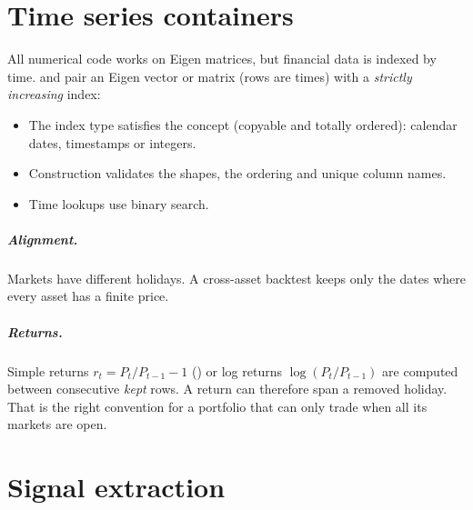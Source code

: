 
\chapter{Time series containers}\label{c:sec:dataframe}

All numerical code works on Eigen matrices, but financial data is indexed by time.
 and  pair an Eigen vector or matrix (rows
are times) with a \emph{strictly increasing} index:
\begin{itemize}
  \item The index type satisfies the  concept (copyable and totally
        ordered): calendar dates, timestamps or integers.
  \item Construction validates the shapes, the ordering and unique column names.
  \item Time lookups use binary search.
\end{itemize}

\paragraph{Alignment.} Markets have different holidays. A cross-asset backtest keeps only
the dates where every asset has a finite price.

\paragraph{Returns.} Simple returns $r_t=P_t/P_{t-1}-1$ () or log returns
$\log(P_t/P_{t-1})$ are computed between consecutive \emph{kept} rows. A return can
therefore span a removed holiday. That is the right convention for a portfolio that can
only trade when all its markets are open.

\begin{codepointers}
\end{codepointers}

\chapter{Signal extraction}\label{c:sec:signal}

